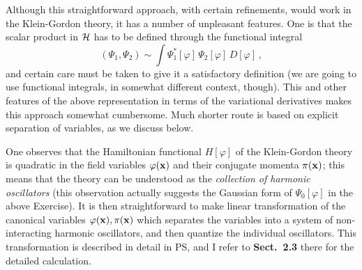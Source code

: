 Although this straightforward approach, with certain refinements, would work
in the Klein-Gordon theory, it has a number of unpleasant features. One is
that the scalar product in $\mathcal{H}$ has to be defined through the functional
integral
\[
(\Psi_1,\Psi_2)\sim\int\Psi_1^*[\varphi]\,\Psi_2[\varphi]\,D[\varphi]\,,
\]
and certain care must be taken to give it a satisfactory definition (we are
going to use functional integrals, in somewhat different context, though).
This and other features of the above representation in terms of the
variational derivatives makes this approach somewhat cumbersome. Much shorter
route is based on explicit separation of variables, as we discuss below.

One observes that the Hamiltonian functional $H[\varphi]$ of the
Klein-Gordon theory is quadratic in the field variables $\varphi(\mathbf{x})$ and
their conjugate momenta $\pi(\mathbf{x})$; this means that the theory can be
understood as the \emph{collection of harmonic oscillators} (this observation
actually suggests the Gaussian form of $\Psi_0[\varphi]$ in the above
Exercise). It is then straightforward to make linear transformation of the
canonical variables $\varphi(\mathbf{x}),\pi(\mathbf{x})$ which separates the variables into
a system of non-interacting harmonic oscillators, and then quantize the
individual oscillators. This transformation is described in detail in PS,
and I refer to \textbf{Sect.~2.3} there for the detailed calculation.

